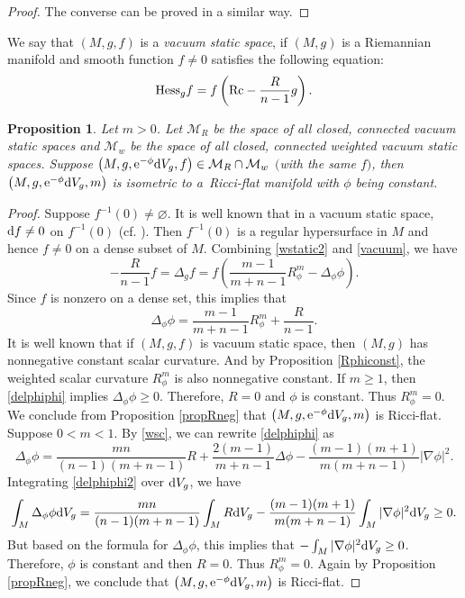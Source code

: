 \documentclass[pdftex]{sigma}
\numberwithin{equation}{section}
\newtheorem{Proposition}[Theorem]{Proposition}
 { \theoremstyle{definition}
\newtheorem{Definition}[Theorem]{Definition}
\newtheorem{Note}[Theorem]{Note}
\newtheorem{Example}[Theorem]{Example}
\newtheorem{Remark}[Theorem]{Remark} }
\begin{document}
\begin{proof}
The converse can be proved in a similar way.
\end{proof}

We say that $(M,g,f)$ is a \textit{vacuum static space}, if $(M,g)$ is a Riemannian manifold and smooth function $f\neq0$ satisfies the following equation:
\begin{equation}\label{vacuum}
 {\rm Hess}_g f=f\left({\rm Rc}-\frac{R}{n-1}g\right).
\end{equation}

\begin{Proposition}
Let $m>0$. Let $\mathcal{M}_R$ be the space of all closed, connected vacuum static spaces and $\mathcal{M}_w$ be the space of all closed,
connected weighted vacuum static spaces. Suppose $\bigl(M,g,{\rm e}^{-\phi}{\rm d}V_g,f\bigr)\in \mathcal{M}_R\cap \mathcal{M}_w$ $($with the same $f)$, then $\bigl(M,g,{\rm e}^{-\phi}{\rm d}V_g,m\bigr)$ is isometric to a~Ricci-flat manifold with $\phi$ being constant.
\end{Proposition}
\begin{proof}
Suppose $f^{-1}(0)\neq \varnothing$. It is well known that in a vacuum static space, ${\rm d}f\neq0$ on $f^{-1}(0)$ (cf. \cite{Fischer&Marsden}). Then $f^{-1}(0)$ is a regular hypersurface in $M$ and hence $f\neq0$ on a dense subset of $M$. Combining \eqref{wstatic2} and \eqref{vacuum}, we have
 \begin{equation*}
 -\frac{R}{n-1}f=\Delta_gf=f\left(\frac{m-1}{m+n-1}R_\phi^m-\Delta_\phi\phi\right).
 \end{equation*}
Since $f$ is nonzero on a dense set, this implies that
\begin{equation}\label{delphiphi}
 \Delta_\phi\phi=\frac{m-1}{m+n-1}R_\phi^m+\frac{R}{n-1}.
\end{equation}
 It is well known that if $(M,g,f)$ is vacuum static space, then $(M,g)$ has nonnegative constant scalar curvature. And by Proposition \ref{Rphiconst}, the weighted scalar curvature $R_\phi^m$ is also nonnegative constant. If $m\geq1$, then \eqref{delphiphi} implies $\Delta_\phi\phi\geq0$. Therefore, $R=0$ and $\phi$ is constant. Thus $R_\phi^m=0$. We conclude from Proposition \ref{propRneg} that $\bigl(M,g,{\rm e}^{-\phi}{\rm d}V_g,m\bigr)$ is Ricci-flat. Suppose $0<m<1$. By \eqref{wsc}, we can rewrite \eqref{delphiphi} as
 \begin{equation}\label{delphiphi2}
 \Delta_\phi\phi=\frac{mn}{(n-1)(m+n-1)}R+\frac{2(m-1)}{m+n-1}\Delta \phi-\frac{(m-1)(m+1)}{m(m+n-1)}|\nabla \phi|^2.
 \end{equation}
 Integrating \eqref{delphiphi2} over ${\rm d}V_g$, we have
 \begin{equation*}
 \int_M \Delta_\phi\phi {\rm d}V_g=\frac{mn}{(n-1)(m+n-1)}\int_MR{\rm d}V_g-\frac{(m-1)(m+1)}{m(m+n-1)}\int_M|\nabla \phi|^2{\rm d}V_g\geq0.
 \end{equation*}
 But based on the formula for $\Delta_\phi\phi$, this implies that $-\int_M|\nabla \phi|^2{\rm d}V_g\geq0$. Therefore, $\phi$ is constant and then $R=0$. Thus $R_\phi^m=0$. Again by Proposition \ref{propRneg}, we conclude that $\bigl(M,g,{\rm e}^{-\phi}{\rm d}V_g,m\bigr)$ is Ricci-flat.
\end{proof}
\end{document}
